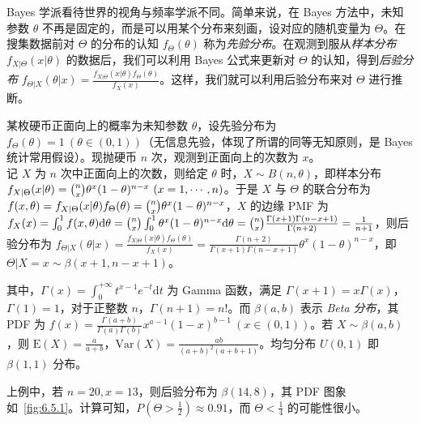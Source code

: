 \documentclass[../main.tex]{subfiles}
\begin{document}
Bayes 学派看待世界的视角与频率学派不同。简单来说，在 Bayes 方法中，未知参数 $\theta$ 不再是固定的，而是可以用某个分布来刻画，设对应的随机变量为 $\Theta$。在搜集数据前对 $\Theta$ 的分布的认知 $f_\Theta(\theta)$ 称为\emph{先验分布}。在观测到服从\emph{样本分布} $f_{X|\Theta}(x|\theta)$ 的数据后，我们可以利用 Bayes 公式来更新对 $\Theta$ 的认知，得到\emph{后验分布} $f_{\Theta|X}(\theta|x)=\frac{f_{X|\Theta}(x|\theta)f_\Theta(\theta)}{f_X(x)}$。这样，我们就可以利用后验分布来对 $\Theta$ 进行推断。

\begin{example}
    某枚硬币正面向上的概率为未知参数 $\theta$，设先验分布为 $f_\Theta(\theta)=1\ (\theta\in(0,1))$（无信息先验，体现了所谓的同等无知原则，是 Bayes 统计常用假设）。现抛硬币 $n$ 次，观测到正面向上的次数为 $x$。\\
    记 $X$ 为 $n$ 次中正面向上的次数，则给定 $\theta$ 时，$X\sim B(n,\theta)$，即样本分布 $f_{X|\Theta}(x|\theta)=\tbinom nx\theta^x(1-\theta)^{n-x}\ (x=1,\cdots,n)$。于是 $X$ 与 $\Theta$ 的联合分布为 $f(x,\theta)=f_{X|\Theta}(x|\theta)f_\Theta(\theta)=\tbinom nx\theta^x(1-\theta)^{n-x}$，$X$ 的边缘 PMF 为 $f_X(x)=\int_0^1f(x,\theta)\mathrm d\theta=\tbinom nx\int_0^1\theta^x(1-\theta)^{n-x}\mathrm d\theta=\tbinom nx\frac{\Gamma(x+1)\Gamma(n-x+1)}{\Gamma(n+2)}=\frac1{n+1}$，则后验分布为 $f_{\Theta|X}(\theta|x)=\frac{f_{X|\Theta}(x|\theta)f_\Theta(\theta)}{f_X(x)}=\frac{\Gamma(n+2)}{\Gamma(x+1)\Gamma(n-x+1)}\theta^x(1-\theta)^{n-x}$，即 $\Theta|X=x\sim\beta(x+1,n-x+1)$。
\end{example}

其中，$\Gamma(x)=\int_0^{+\infty} t^{x-1}e^{-t}\mathrm dt$ 为 Gamma 函数，满足 $\Gamma(x+1)=x\Gamma(x)$，$\Gamma(1)=1$，对于正整数 $n$，$\Gamma(n+1)=n!$。而 $\beta(a,b)$ 表示 \emph{Beta 分布}，其 PDF 为 $f(x)=\frac{\Gamma(a+b)}{\Gamma(a)\Gamma(b)}x^{a-1}(1-x)^{b-1}\ (x\in(0,1))$。若 $X\sim\beta(a,b)$，则 $\mathrm E(X)=\frac a{a+b}$，$\mathrm{Var}(X)=\frac{ab}{(a+b)^2(a+b+1)}$。均匀分布 $U(0,1)$ 即 $\beta(1,1)$ 分布。

上例中，若 $n=20,x=13$，则后验分布为 $\beta(14,8)$，其 PDF 图象如~\ref{fig:6.5.1}。计算可知，$P(\Theta>\frac12)\approx0.91$，而 $\Theta<\frac14$ 的可能性很小。
\end{document}
